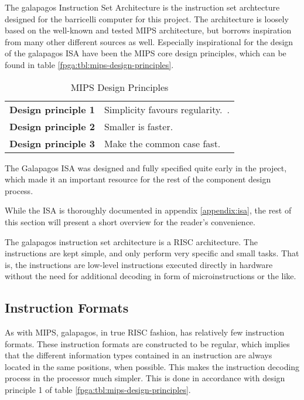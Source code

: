 The \Gls{galapagos} Instruction Set Architecture is the instruction set archtecture designed for the \Gls{barricelli} computer for this project.
The architecture is loosely based on the well-known and tested \gls{MIPS} architecture\cn, but borrows inspiration from many other different sources as well.
Especially inspirational for the design of the \Gls{galapagos} ISA have been the \gls{MIPS} core design principles, which can be found in table \vref{fpga:tbl:mips-design-principles}.

\begin{table}[H]
\centering
    \begin{tabular}{l l} 
     \textbf{Design principle 1} & Simplicity favours regularity.~\cite[p.~79]{compOrgDes}. \\
     \textbf{Design principle 2} & Smaller is faster.~\cite[p.~81]{compOrgDes} \\
     \textbf{Design principle 3} & Make the common case fast.~\cite[p.~86]{compOrgDes} \\
    \hline
\end{tabular}
    \caption{MIPS Design Principles}
    \label{fpga:tbl:mips-design-principles}
\end{table}

The Galapagos ISA was designed and fully specified quite early in the project, which made it an important resource for the rest of the component design process.

While the ISA is thoroughly documented in appendix \vref{appendix:isa}, the rest of this section will present a short overview for the reader's convenience.

The \Gls{galapagos} instruction set architecture is a RISC architecture.
The instructions are kept simple, and only perform very specific and small tasks.
That is, the instructions are low-level instructions executed directly in hardware without the need for additional decoding in form of microinstructions or the like.

\subsection{Instruction Formats}

As with \Gls{MIPS}, \Gls{galapagos}, in true \gls{RISC} fashion, has relatively few instruction formats.
These instruction formats are constructed to be regular, which implies that the different information types contained in an instruction are always located in the same positions, when possible.
This makes the instruction decoding process in the processor much simpler.
This is done in accordance with design principle 1 of table \vref{fpga:tbl:mips-design-principles}.

